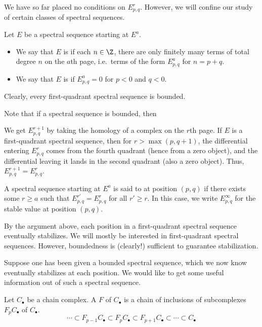 \documentclass[main.tex]{subfiles}
\begin{document}
We have so far placed no conditions on $E^{r}_{p,q}$. However, we will confine our study of certain classes of spectral sequences.

\begin{definition}
  \label{def:bounded_first_quadrant}
  Let $E$ be a spectral sequence starting at $E^{a}$.
  \begin{itemize}
    \item We say that $E$ is  if each $n \in \Z$, there are only finitely many terms of total degree $n$ on the $a$th page, i.e.\ terms of the form $E^{a}_{p, q}$ for $n = p+q$.

    \item We say that $E$ is  if $E^{a}_{p,q} = 0$ for $p < 0$ and $q < 0$.
  \end{itemize}
\end{definition}
Clearly, every first-quadrant spectral sequence is bounded.

Note that if a spectral sequence is bounded, then

We get $E^{r+1}_{p,q}$ by taking the homology of a complex on the $r$th page. If $E$ is a first-quadrant spectral sequence, then for $r > \max(p,q+1)$, the differential entering $E^{r}_{p,q}$ comes from the fourth quadrant (hence from a zero object), and the differential leaving it lands in the second quadrant (also a zero object). Thus, $E^{r+1}_{p,q} = E^{r}_{p,q}$.

\begin{definition}[stabilize]
  \label{def:stabilize}
  A spectral sequence starting at $E^{a}$ is said to  at position $(p,q)$ if there exists some $r \geq a$ such that $E^{r'}_{p,q} = E^{r}_{p,q}$ for all $r' \geq r$. In this case, we write $E^{\infty}_{p,q}$ for the stable value at position $(p,q)$.
\end{definition}

By the argument above, each position in a first-quadrant spectral sequence eventually stabilizes. We will mostly be interested in first-quadrant spectral sequences. However, boundedness is (clearly!) sufficient to guarantee stabilization.

Suppose one has been given a bounded spectral sequence, which we now know eventually stabilizes at each position. We would like to get some useful information out of such a spectral sequence.

\begin{definition}[filtration]
  \label{def:filtration}
  Let $C_{\bullet}$ be a chain complex. A  $F$ of $C_{\bullet}$ is a chain of inclusions of subcomplexes $F_{p}C_{\bullet}$ of $C_{\bullet}$.
  \begin{equation*}
      \cdots
      \subset
      F_{p-1}C_{\bullet}
      \subset
      F_{p}C_{\bullet}
      \subset
      F_{p+1}C_{\bullet}
      \subset
      \cdots
      \subset C_{\bullet}
  \end{equation*}
\end{definition}
\end{document}
